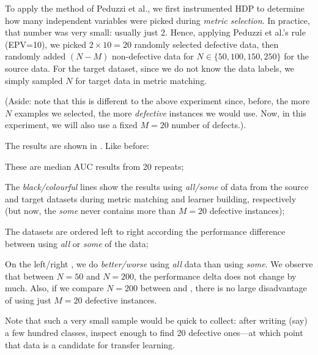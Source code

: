   To apply the method of Peduzzi et al., we first instrumented HDP to determine how many
  independent variables were picked during {\em metric  selection}. In practice, that number
  was very small: usually just 2. Hence, applying  Peduzzi et al.'s rule (EPV=10), we picked $2\times 10=20$ %
  randomly selected defective data, then randomly added $(N-M)$ non-defective data for
  $N\in \{50,100,150,250\}$ for the source data. For the target dataset, since we do not
  know the data labels, we simply sampled $N$ for target data in metric matching.

  (Aside: note that this is different to the above experiment since, before, the more $N$ examples
  we selected, the more {\em defective} instances we would use. Now, in this experiment, we will also
  use a fixed $M=20$ number of defects.).

  The results are shown in . Like before:
\squishlist
  \item These are median AUC results from 20 repeats;
\item
  The {\em black/colourful} lines show the results using {\em all/some} of  data from
  the source and target datasets during metric matching and learner building, respectively
  (but now, the {\em some} never contains more than $M=20$ defective instances);
\item
  The datasets are ordered left to right according
  the performance difference between using
   {\em all} or {\em some} of the data;
   \item
     On the left/right ,  we do {\em better/worse} using
  {\em all} data than using {\em some}.
\squishend
  We observe that between $N=50$ and $N=200$, the performance delta
  does not change by much. Also, if we compare $N=200$ between 
  and , there is no large disadvantage of using just
  $M=20$ defective instances.

  Note that such a very small sample would be quick to collect: after writing (say) a few
  hundred classes, inspect enough to find 20 defective ones---at which point that data is a candidate
  for transfer learning.
